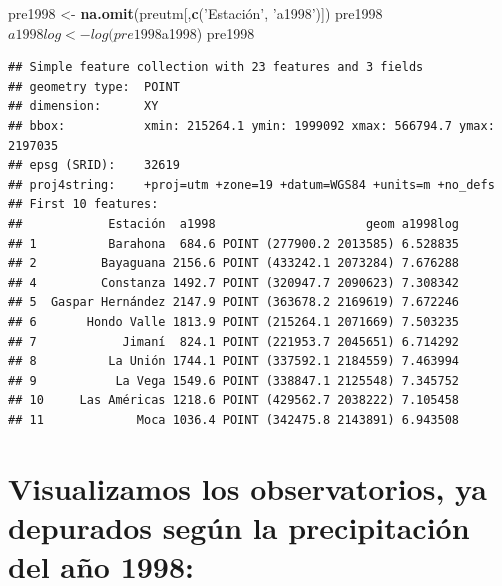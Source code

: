 \documentclass[11pt,]{article}
\newenvironment{Shaded}{\begin{snugshade}}{\end{snugshade}}
\newcommand{\KeywordTok}[1]{\textcolor[rgb]{0.13,0.29,0.53}{\textbf{#1}}}
\newcommand{\StringTok}[1]{\textcolor[rgb]{0.31,0.60,0.02}{#1}}
\newcommand{\NormalTok}[1]{#1}
\begin{document}
\begin{Shaded}
\begin{Highlighting}[]
\NormalTok{pre1998 <-}\StringTok{ }\KeywordTok{na.omit}\NormalTok{(preutm[,}\KeywordTok{c}\NormalTok{(}\StringTok{'Estación', '}\NormalTok{a1998}\StringTok{')])}
\StringTok{pre1998$a1998log <- log(pre1998$a1998)}
\StringTok{pre1998}
\end{Highlighting}
\end{Shaded}

\begin{verbatim}
## Simple feature collection with 23 features and 3 fields
## geometry type:  POINT
## dimension:      XY
## bbox:           xmin: 215264.1 ymin: 1999092 xmax: 566794.7 ymax: 2197035
## epsg (SRID):    32619
## proj4string:    +proj=utm +zone=19 +datum=WGS84 +units=m +no_defs
## First 10 features:
##            Estación  a1998                     geom a1998log
## 1          Barahona  684.6 POINT (277900.2 2013585) 6.528835
## 2         Bayaguana 2156.6 POINT (433242.1 2073284) 7.676288
## 4         Constanza 1492.7 POINT (320947.7 2090623) 7.308342
## 5  Gaspar Hernández 2147.9 POINT (363678.2 2169619) 7.672246
## 6       Hondo Valle 1813.9 POINT (215264.1 2071669) 7.503235
## 7            Jimaní  824.1 POINT (221953.7 2045651) 6.714292
## 8          La Unión 1744.1 POINT (337592.1 2184559) 7.463994
## 9           La Vega 1549.6 POINT (338847.1 2125548) 7.345752
## 10     Las Américas 1218.6 POINT (429562.7 2038222) 7.105458
## 11             Moca 1036.4 POINT (342475.8 2143891) 6.943508
\end{verbatim}

\section{Visualizamos los observatorios, ya depurados según la
precipitación del año
1998:}\label{visualizamos-los-observatorios-ya-depurados-seguxfan-la-precipitaciuxf3n-del-auxf1o-1998}
\end{document}
